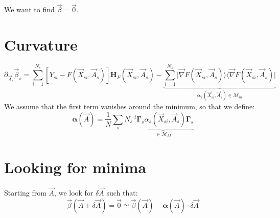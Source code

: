 \documentclass[aps,12pt]{revtex4}
\newcommand{\trn}[1]{~^t{#1}}
\begin{document}
We want to find $\vec{\beta} = \vec{0}$.

\section{Curvature}
\begin{equation}
	\partial_{\vec{A}_s} \vec{\beta}_s = \sum_{i=1}^{N_s}  \left[ Y_{si} - F(\vec{X}_{si},\vec{A}_s) \right] \bm{H}_F(\vec{X}_{si},\vec{A}_s)
	- \underbrace{
	\sum_{i=1}^{N_s} \vert\vec{\nabla} F(\vec{X}_{si},\vec{A}_s) \rangle  \langle\vec{\nabla} F(\vec{X}_{si},\vec{A}_s)\vert
	}_{\bm{\alpha}_s(\vec{X}_{si},\vec{A}_s)\in\mathcal{M}_{m} }
\end{equation}
We assume that the first term vanishes around the minimum, so that we define:
\begin{equation}
	\bm{\alpha}(\vec{A}) = \dfrac{1}{N} \sum_s N_s \underbrace{\trn{\bm{\Gamma}_s} \alpha_s (\vec{X}_{si},\vec{A}_s) \bm{\Gamma}_s}_{\in \mathcal{M}_M}
\end{equation}

\section{Looking for minima}

Starting from $\vec{A}$, we look for $\delta\vec{A}$ such that:
\begin{equation}
	\vec{\beta}(\vec{A}+\delta\vec{A}) = \vec{0} \simeq \vec{\beta}(\vec{A}) - \bm{\alpha}(\vec{A}) \cdot \delta \vec{A}
\end{equation}
\end{document}
